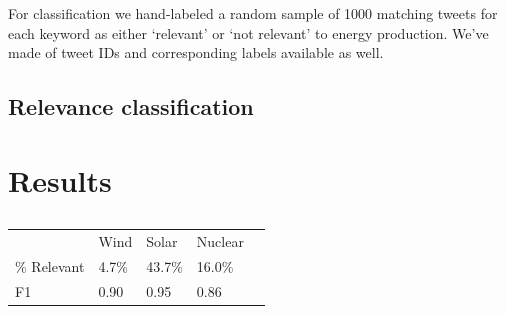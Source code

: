 For classification we hand-labeled a random sample of 1000 matching tweets
for each keyword
as either `relevant' or `not relevant' to energy production. 
We've made of tweet IDs and corresponding labels available as well.



\subsection{Relevance classification}



\subsection{}



\subsection{}


















\section{Results}
\label{sec:corpusCreation.results}

\begin{table}[t]
\begin{tabular}{lllll}
\toprule
   & Wind & Solar & Nuclear \\
     \cmidrule(lr){2-4} 

   \% Relevant & 4.7\% & 43.7\% & 16.0\% \\
F1 & 0.90 & 0.95  & 0.86   \\

  \bottomrule

\end{tabular}
\caption{}
\label{tab:F1-scores}
\end{table}



